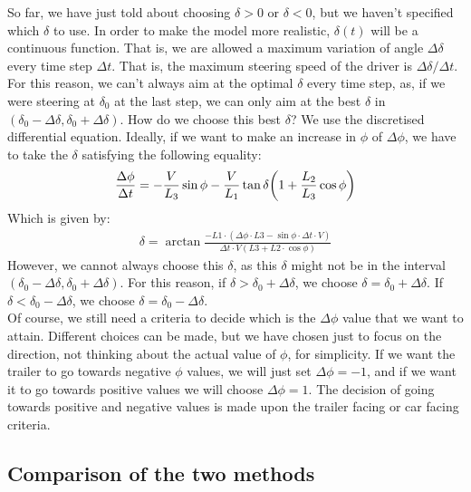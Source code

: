 So far, we have just told about choosing $\delta > 0$ or $\delta < 0$, but we haven't specified which $\delta$ to use. In order to make the model more realistic, $\delta(t)$ will be a continuous function. That is, we are allowed a maximum variation of angle $\Delta \delta$ every time step $\Delta t$. That is, the maximum steering speed of the driver is $\Delta \delta / \Delta t$. For this reason, we can't always aim at the optimal $\delta$ every time step, as, if we were steering at $\delta_0$ at the last step, we can only aim at the best $\delta$ in $(\delta_0 -\Delta \delta, \delta_0 + \Delta \delta)$. How do we choose this best $\delta$? We use the discretised differential equation. Ideally, if we want to make an increase in $\phi$ of $\Delta \phi$, we have to take the $\delta$ satisfying the following equality:
\begin{align}
    \frac{\Delta \phi}{\Delta t} = - \frac{V}{L_{3}} \sin \phi - \frac{V}{L_{1}} \tan \delta \qty( 1 + \frac{L_{2}}{L_{3}} \cos \phi )
\end{align}
Which is given by:
\begin{align}
    \delta = \arctan\frac{-L1\cdot(\Delta \phi\cdot L3-\sin\phi\cdot\Delta t\cdot V)}{\Delta t\cdot V(L3+L2\cdot \cos\phi)} 
\end{align}
However, we cannot always choose this $\delta$, as this $\delta$ might not be in the interval $(\delta_0 -\Delta \delta, \delta_0 + \Delta \delta)$. For this reason, if $\delta > \delta_0 + \Delta \delta$, we choose $\delta = \delta_0 + \Delta \delta$. If $\delta < \delta_0 - \Delta \delta$, we choose $\delta = \delta_0 - \Delta \delta$.\\

Of course, we still need a criteria to decide which is the $\Delta \phi$ value that we want to attain. Different choices can be made, but we have chosen just to focus on the direction, not thinking about the actual value of $\phi$, for simplicity. If we want the trailer to go towards negative $\phi$ values, we will just set $\Delta \phi = -1$, and if we want it to go towards positive values we will choose $\Delta \phi = 1$. The decision of going towards positive and negative values is made upon the trailer facing or car facing criteria.



\subsection{Comparison of the two methods}

